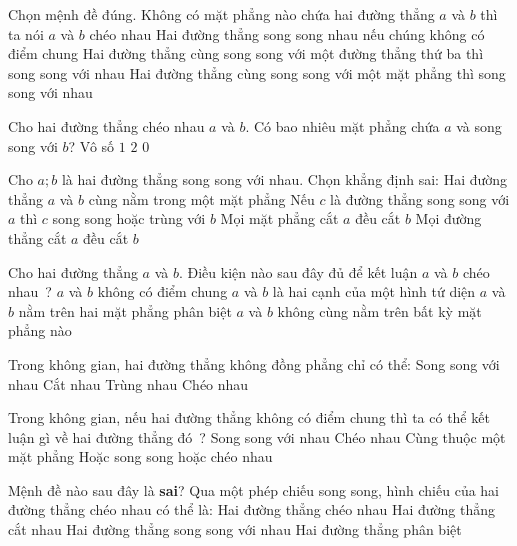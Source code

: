 \begin{ex}%
	Chọn mệnh đề đúng.
	\choice
	{\True Không có mặt phẳng nào chứa hai đường thẳng $a$ và $b$ thì ta nói $a$ và $b$ chéo nhau}
	{Hai đường thẳng song song nhau nếu chúng không có điểm chung}
	{Hai đường thẳng cùng song song với một đường thẳng thứ ba thì song song với nhau}
	{Hai đường thẳng cùng song song với một mặt phẳng thì song song với nhau}
	\loigiai{
	}
\end{ex}
\begin{ex}%
	Cho hai đường thẳng chéo nhau $a$ và $b$. Có bao nhiêu mặt phẳng chứa $a$ và song song với $b$?
	\choice
	{Vô số}
	{\True $1$}
	{$2$}
	{$0$}
	\loigiai{
	}
\end{ex}
\begin{ex}%
	Cho $a;b$ là hai đường thẳng song song với nhau. Chọn khẳng định sai:
	\choice
	{Hai đường thẳng $a$ và $b$ cùng nằm trong một mặt phẳng}
	{Nếu $c$ là đường thẳng song song với $a$ thì $c$ song song hoặc trùng với $b$}
	{Mọi mặt phẳng cắt $a$ đều cắt $b$}
	{\True Mọi đường thẳng cắt $a$ đều cắt $b$}
	\loigiai{
	}
\end{ex}
\begin{ex}%
	Cho hai đường thẳng $a$ và $b$. Điều kiện nào sau đây đủ để kết luận $a$ và $b$ chéo nhau ?
	\choice
	{$a$ và $b$ không có điểm chung}
	{$a$ và $b$ là hai cạnh của một hình tứ diện}
	{$a$ và $b$ nằm trên hai mặt phẳng phân biệt}
	{\True $a$ và $b$ không cùng nằm trên bất kỳ mặt phẳng nào}
	\loigiai{
	}
\end{ex}
\begin{ex}%
	Trong không gian, hai đường thẳng không đồng phẳng chỉ có thể:
	\choice
	{Song song với nhau}
	{Cắt nhau}
	{Trùng nhau}
	{\True Chéo nhau}
	\loigiai{
	}
\end{ex}
\begin{ex}%
	Trong không gian, nếu hai đường thẳng không có điểm chung thì ta có thể kết luận gì về hai đường thẳng đó ?
	\choice
	{Song song với nhau}
	{Chéo nhau}
	{Cùng thuộc một mặt phẳng}
	{\True Hoặc song song hoặc chéo nhau}
	\loigiai{
	}
\end{ex}
\begin{ex}%
	Mệnh đề nào sau đây là \textbf{sai}? Qua một phép chiếu song song, hình chiếu của hai đường thẳng chéo nhau có thể là:
	\choice
	{\True Hai đường thẳng chéo nhau}
	{Hai đường thẳng cắt nhau}
	{Hai đường thẳng song song với nhau}
	{Hai đường thẳng phân biệt}
	\loigiai{
	}
\end{ex}
